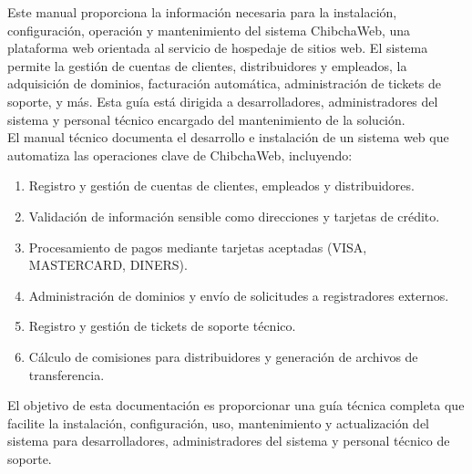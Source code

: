 Este manual proporciona la información necesaria para la instalación, configuración, operación y mantenimiento del sistema ChibchaWeb, una plataforma web orientada al servicio de hospedaje de sitios web. El sistema permite la gestión de cuentas de clientes, distribuidores y empleados, la adquisición de dominios, facturación automática, administración de tickets de soporte, y más. Esta guía está dirigida a desarrolladores, administradores del sistema y personal técnico encargado del mantenimiento de la solución. \\

El manual técnico documenta el desarrollo e instalación de un sistema web que automatiza las operaciones clave de ChibchaWeb, incluyendo: 

\begin{enumerate}
    \item {Registro y gestión de cuentas de clientes, empleados y distribuidores.}
    \item {Validación de información sensible como direcciones y tarjetas de crédito.}
    \item {Procesamiento de pagos mediante tarjetas aceptadas (VISA, MASTERCARD, DINERS).}
    \item {Administración de dominios y envío de solicitudes a registradores externos.}
    \item {Registro y gestión de tickets de soporte técnico.}
    \item {Cálculo de comisiones para distribuidores y generación de archivos de transferencia. }
\end{enumerate}

El objetivo de esta documentación es proporcionar una guía técnica completa que facilite la instalación, configuración, uso, mantenimiento y actualización del sistema para desarrolladores, administradores del sistema y personal técnico de soporte. 